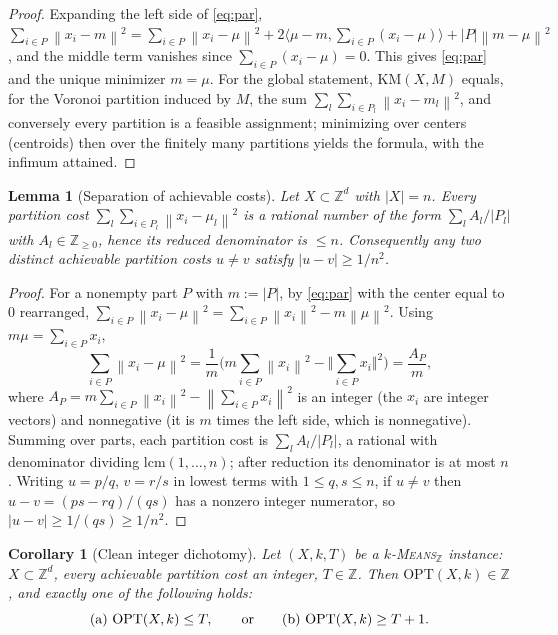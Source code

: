 \documentclass{amsart}
\theoremstyle{plain}
\newtheorem{lemma}{Lemma}
\newtheorem{corollary}{Corollary}
\theoremstyle{definition}
\newcommand{\Z}{\mathbb{Z}}
\newcommand{\norm}[1]{\left\lVert #1 \right\rVert}
\begin{document}
\begin{proof}
Expanding the left side of \eqref{eq:par},
$\sum_{i\in P}\norm{x_{i}-m}^{2}=\sum_{i\in P}\norm{x_{i}-\mu}^{2}
+2\langle\mu-m,\sum_{i\in P}(x_{i}-\mu)\rangle+|P|\norm{m-\mu}^{2}$, and the middle
term vanishes since $\sum_{i\in P}(x_{i}-\mu)=0$. This gives \eqref{eq:par} and the
unique minimizer $m=\mu$. For the global statement, $\mathrm{KM}(X,M)$ equals, for
the Voronoi partition induced by $M$, the sum $\sum_{l}\sum_{i\in P_{l}}
\norm{x_{i}-m_{l}}^{2}$, and conversely every partition is a feasible assignment;
minimizing over centers (centroids) then over the finitely many partitions yields
the formula, with the infimum attained.
\end{proof}

\begin{lemma}[Separation of achievable costs]\label{lem:sep}
Let $X\subset\Z^{d}$ with $|X|=n$. Every partition cost
$\sum_{l}\sum_{i\in P_{l}}\norm{x_{i}-\mu_{l}}^{2}$ is a rational number of the form
$\sum_{l}A_{l}/|P_{l}|$ with $A_{l}\in\Z_{\ge0}$, hence its reduced denominator is
$\le n$. Consequently any two \emph{distinct} achievable partition costs $u\ne v$
satisfy $|u-v|\ge 1/n^{2}$.
\end{lemma}

\begin{proof}
For a nonempty part $P$ with $m:=|P|$, by \eqref{eq:par} with the center equal to
$0$ rearranged, $\sum_{i\in P}\norm{x_{i}-\mu}^{2}=\sum_{i\in P}\norm{x_{i}}^{2}
-m\norm{\mu}^{2}$. Using $m\mu=\sum_{i\in P}x_{i}$,
\[
\sum_{i\in P}\norm{x_{i}-\mu}^{2}
=\frac{1}{m}\Big(m\sum_{i\in P}\norm{x_{i}}^{2}-\Big\Vert\sum_{i\in P}x_{i}\Big\Vert^{2}\Big)
=\frac{A_{P}}{m},
\]
where $A_{P}=m\sum_{i\in P}\norm{x_{i}}^{2}-\norm{\sum_{i\in P}x_{i}}^{2}$ is an
integer (the $x_{i}$ are integer vectors) and nonnegative (it is $m$ times the
left side, which is nonnegative). Summing over parts, each partition cost is
$\sum_{l}A_{l}/|P_{l}|$, a rational with denominator dividing
$\mathrm{lcm}(1,\dots,n)$; after reduction its denominator is at most $n$. Writing
$u=p/q$, $v=r/s$ in lowest terms with $1\le q,s\le n$, if $u\ne v$ then
$u-v=(ps-rq)/(qs)$ has a nonzero integer numerator, so $|u-v|\ge1/(qs)\ge1/n^{2}$.
\end{proof}

\begin{corollary}[Clean integer dichotomy]\label{cor:dich}
Let $(X,k,T)$ be a \textsc{$k$-Means$_{\Z}$} instance: $X\subset\Z^{d}$, every
achievable partition cost an integer, $T\in\Z$. Then $\mathrm{OPT}(X,k)\in\Z$, and
exactly one of the following holds:
\[
\textup{(a) } \mathrm{OPT}(X,k)\le T,
\qquad\text{or}\qquad
\textup{(b) } \mathrm{OPT}(X,k)\ge T+1 .
\]
\end{corollary}
\end{document}
